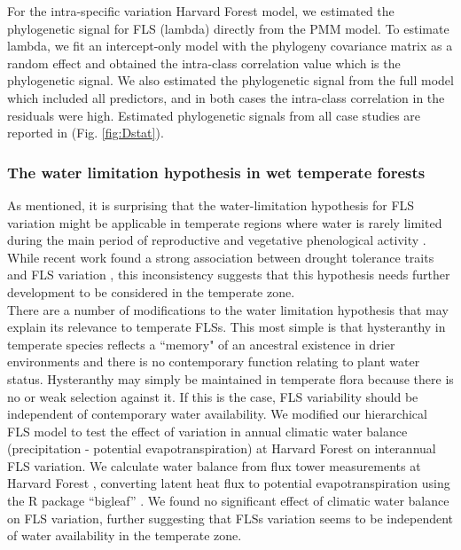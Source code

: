 \documentclass[11pt]{article}
\begin{document}
{\noindent For the intra-specific variation Harvard Forest model, we estimated the phylogenetic signal for FLS (lambda) directly from the PMM model. To estimate lambda, we fit an intercept-only model with the phylogeny covariance matrix as a random effect and obtained the intra-class correlation value which is the phylogenetic signal. We also estimated the phylogenetic signal from the full model which included all predictors, and in both cases the intra-class correlation in the residuals were high. Estimated phylogenetic signals from all case studies are reported in (Fig. \ref{fig:Dstat}).  
  
\subsubsection*{The water limitation hypothesis in wet temperate forests}
\noindent As mentioned, it is surprising that the water-limitation hypothesis for FLS variation might be applicable in temperate regions where water is rarely limited during the main period of reproductive and vegetative phenological activity \citep{Polgar2011}. While recent work found a strong association between drought tolerance traits and FLS variation \citep{Gougherty2018}, this inconsistency suggests that this hypothesis needs further development to be considered in the temperate zone.\\

\noindent There are a number of modifications to the water limitation hypothesis that may explain its relevance to temperate FLSs. This most simple is that hysteranthy in temperate species reflects a ``memory" of an ancestral existence in drier environments and there is no contemporary function relating to plant water status. Hysteranthy may simply be maintained in temperate flora because there is no or weak selection against it. If this is the case, FLS variability should be independent of contemporary water availability. We modified our hierarchical FLS model to test the effect of variation in annual climatic water balance (precipitation - potential evapotranspiration) at Harvard Forest on interannual FLS variation. We calculate water balance from flux tower measurements at Harvard Forest \citep{Hadley2004}, converting latent heat flux to potential evapotranspiration using the R package ``bigleaf'' \citep{Knauer2018}. We found no significant effect of climatic water balance on FLS variation, further suggesting that FLSs variation seems to be independent of water availability in the temperate zone.\\%

}
\end{document}
